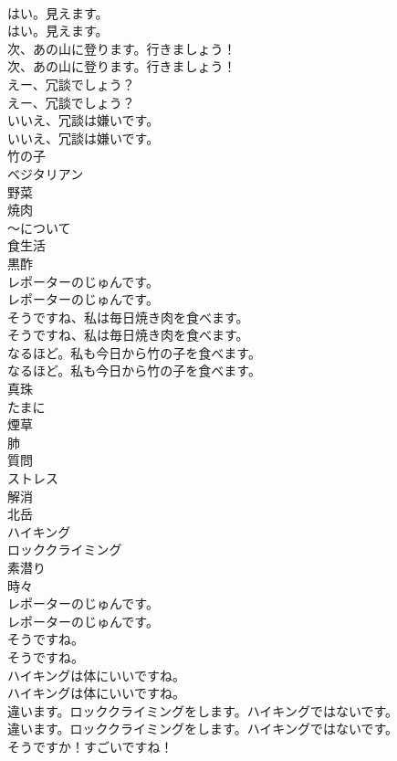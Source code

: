 \documentclass[8pt]{extreport}
\begin{document}
\begin{CJK}{UTF8}{min}
\\	はい。見えます。	
\\	はい。見えます。 
\\	次、あの山に登ります。行きましょう！	
\\	次、あの山に登ります。行きましょう！ 
\\	えー、冗談でしょう？	
\\	えー、冗談でしょう？ 
\\	いいえ、冗談は嫌いです。	
\\	いいえ、冗談は嫌いです。 
\\	竹の子
\\	ベジタリアン
\\	野菜
\\	焼肉
\\	～について
\\	食生活
\\	黒酢
\\	レポーターのじゅんです。	
\\	レポーターのじゅんです。 
\\	そうですね、私は毎日焼き肉を食べます。	
\\	そうですね、私は毎日焼き肉を食べます。 
\\	なるほど。私も今日から竹の子を食べます。	
\\	なるほど。私も今日から竹の子を食べます。 
\\	真珠
\\	たまに
\\	煙草
\\	肺
\\	質問
\\	ストレス
\\	解消
\\	北岳
\\	ハイキング
\\	ロッククライミング
\\	素潜り
\\	時々
\\	レポーターのじゅんです。	
\\	レポーターのじゅんです。 
\\	そうですね。	
\\	そうですね。 
\\	ハイキングは体にいいですね。	
\\	ハイキングは体にいいですね。 
\\	違います。ロッククライミングをします。ハイキングではないです。	
\\	違います。ロッククライミングをします。ハイキングではないです。 
\\	そうですか！すごいですね！	

\end{CJK}
\end{document}
